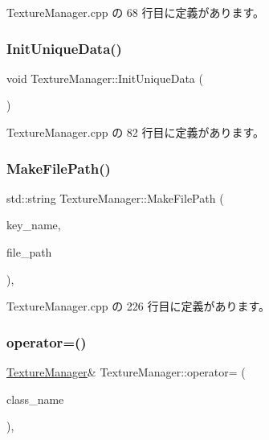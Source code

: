  Texture\+Manager.\+cpp の 68 行目に定義があります。

\mbox{\label{class_texture_manager_abfba2c4293e692a351d9b98e28f6ed31}} 
\subsubsection{\texorpdfstring{Init\+Unique\+Data()}{InitUniqueData()}}
{\footnotesize\ttfamily void Texture\+Manager\+::\+Init\+Unique\+Data (\begin{DoxyParamCaption}{ }\end{DoxyParamCaption})\hspace{0.3cm}{\ttfamily [static]}}



 Texture\+Manager.\+cpp の 82 行目に定義があります。

\mbox{\label{class_texture_manager_a950562ff671a620592708906925fad7f}} 
\subsubsection{\texorpdfstring{Make\+File\+Path()}{MakeFilePath()}}
{\footnotesize\ttfamily std\+::string Texture\+Manager\+::\+Make\+File\+Path (\begin{DoxyParamCaption}\item[{const std\+::string $\ast$}]{key\+\_\+name,  }\item[{const std\+::string $\ast$}]{file\+\_\+path }\end{DoxyParamCaption})\hspace{0.3cm}{\ttfamily [static]}, {\ttfamily [private]}}



 Texture\+Manager.\+cpp の 226 行目に定義があります。

\mbox{\label{class_texture_manager_a3f13712c65812a9053852165a9a67824}} 
\subsubsection{\texorpdfstring{operator=()}{operator=()}}
{\footnotesize\ttfamily \mbox{\hyperlink{class_texture_manager}{Texture\+Manager}}\& Texture\+Manager\+::operator= (\begin{DoxyParamCaption}\item[{const \mbox{\hyperlink{class_texture_manager}{Texture\+Manager}} \&}]{class\+\_\+name }\end{DoxyParamCaption})\hspace{0.3cm}{\ttfamily [private]}, {\ttfamily [delete]}}

